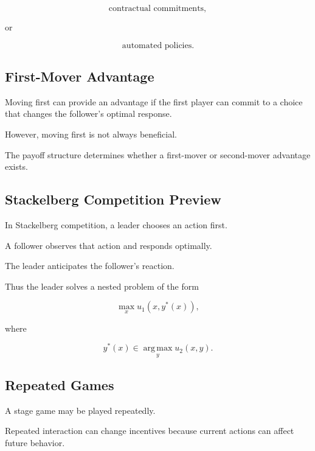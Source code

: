 \[
\boxed{
\text{contractual commitments},
}
\]

or

\[
\boxed{
\text{automated policies}.
}
\]

\subsection{First-Mover Advantage}
\label{subsec:first-mover-advantage}

Moving first can provide an advantage if the first player can commit to a
choice that changes the follower's optimal response.

However, moving first is not always beneficial.

The payoff structure determines whether a first-mover or second-mover
advantage exists.

\subsection{Stackelberg Competition Preview}
\label{subsec:stackelberg-preview}

In Stackelberg competition, a leader chooses an action first.

A follower observes that action and responds optimally.

The leader anticipates the follower's reaction.

Thus the leader solves a nested problem of the form

\[
\boxed{
\max_{x}
u_1
(
x,
y^*(x)
),
}
\]

where

\[
\boxed{
y^*(x)
\in
\operatorname*{arg\,max}_y
u_2(x,y).
}
\]

\subsection{Repeated Games}
\label{subsec:repeated-games}

A stage game may be played repeatedly.

Repeated interaction can change incentives because current actions can
affect future behavior.

